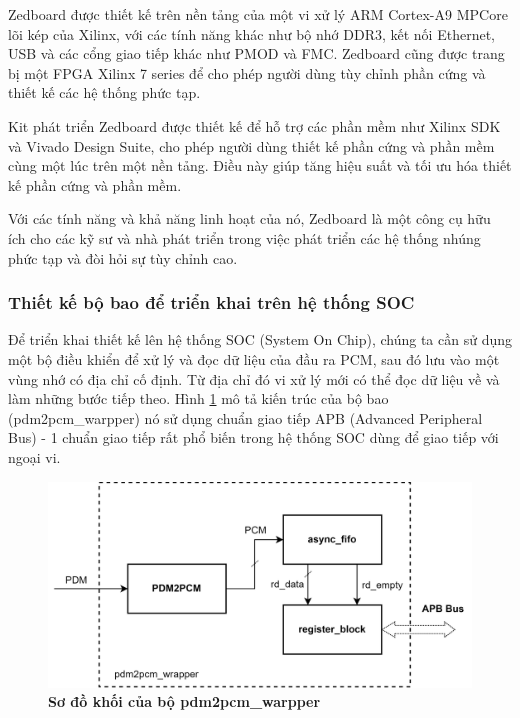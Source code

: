 Zedboard được thiết kế trên nền tảng của một vi xử lý ARM Cortex-A9 MPCore lõi kép của Xilinx, với các tính năng khác như bộ nhớ DDR3, kết nối Ethernet, USB và các cổng giao tiếp khác như PMOD và FMC. Zedboard cũng được trang bị một FPGA Xilinx 7 series để cho phép người dùng tùy chỉnh phần cứng và thiết kế các hệ thống phức tạp.


Kit phát triển Zedboard được thiết kế để hỗ trợ các phần mềm như Xilinx SDK và Vivado Design Suite, cho phép người dùng thiết kế phần cứng và phần mềm cùng một lúc trên một nền tảng. Điều này giúp tăng hiệu suất và tối ưu hóa thiết kế phần cứng và phần mềm.

Với các tính năng và khả năng linh hoạt của nó, Zedboard là một công cụ hữu ích cho các kỹ sư và nhà phát triển trong việc phát triển các hệ thống nhúng phức tạp và đòi hỏi sự tùy chỉnh cao.



\subsubsection{Thiết kế bộ bao để triển khai trên hệ thống SOC} \label{wrapper_cha}

Để triển khai thiết kế lên hệ thống SOC (System On Chip), chúng ta cần sử dụng một bộ điều khiển để xử lý và đọc dữ liệu của đầu ra PCM, sau đó lưu vào một vùng nhớ có địa chỉ cố định. Từ địa chỉ đó vi xử lý mới có thể đọc dữ liệu về và làm những bước tiếp theo. Hình \ref{wrapper} mô tả kiến trúc của bộ bao (pdm2pcm\_warpper) nó sử dụng chuẩn giao tiếp APB (Advanced Peripheral Bus) -  1 chuẩn giao tiếp rất phổ biến trong hệ thống SOC dùng để giao tiếp với ngoại vi.

\begin{figure}[H]
    \centering
    \includegraphics[width=13cm]{Images/Chuong5/fpga/wrapper.png}
    \caption[Sơ đồ khối của bộ pdm2pcm\_warpper]{\bfseries \fontsize{12pt}{0pt}\selectfont Sơ đồ khối của bộ pdm2pcm\_warpper}
    \label{wrapper}
\end{figure}

